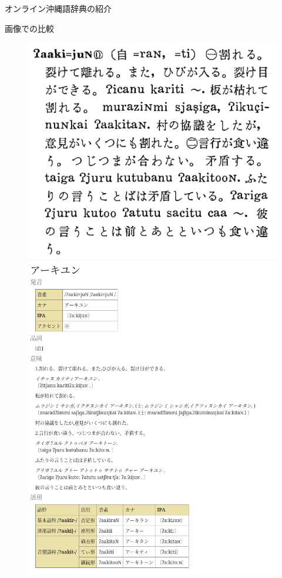 \documentclass[14pt]{beamer}
\begin{document}
\begin{frame}{オンライン沖縄語辞典の紹介}
  \begin{block}{画像での比較}
    \begin{figure}[ht]
      \centering
      \begin{minipage}{0.5\paperwidth}
        \includegraphics[height=0.5\paperheight,width=0.4\paperwidth]{oki-dict-example-aakiyun-original.png}
      \end{minipage}%
      \begin{minipage}{0.5\textwidth}
        \includegraphics[height=0.65\paperheight]{oki-dict-example-aakiyun-online.png}

\end{minipage}
\end{figure}
\end{block}
\end{frame}
\end{document}
